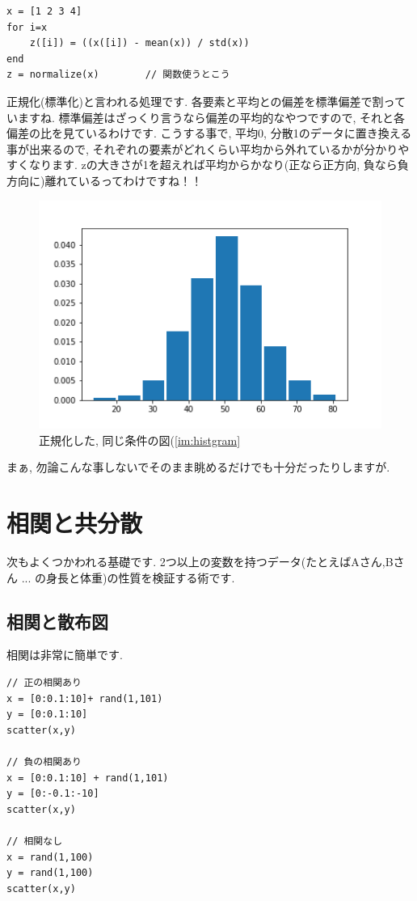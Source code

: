 \documentclass[11pt,a4paper]{jreport}
\begin{document}
\begin{lstlisting}[caption=式(\ref{eq:normalize})のコード,label=sc:normalize,  keepspaces=true]
x = [1 2 3 4]
for i=x
    z([i]) = ((x([i]) - mean(x)) / std(x))
end
z = normalize(x)        // 関数使うとこう
\end{lstlisting}



正規化(標準化)と言われる処理です. 各要素と平均との偏差を標準偏差で割っていますね. 標準偏差はざっくり言うなら偏差の平均的なやつですので, それと各偏差の比を見ているわけです. こうする事で, 平均0, 分散1のデータに置き換える事が出来るので, それぞれの要素がどれくらい平均から外れているかが分かりやすくなります. zの大きさが1を超えれば平均からかなり(正なら正方向, 負なら負方向に)離れているってわけですね！！\\

\begin{figure}[H]
\label{im:z-hist}
  \centering
  \includegraphics[width=120mm,bb=0 0 432 288]{../figures/z-hist.png}
  \caption{正規化した, 同じ条件の図(\ref{im:histgram}}
\end{figure}

まぁ, 勿論こんな事しないでそのまま眺めるだけでも十分だったりしますが.

\section{相関と共分散}
次もよくつかわれる基礎です. 2つ以上の変数を持つデータ(たとえばAさん,Bさん ... の身長と体重)の性質を検証する術です. \\
\subsection{相関と散布図}
相関は非常に簡単です. 
\begin{lstlisting}[caption=図(\ref{im:scatter1}\ref{im:scatter2})のコード,label=sc:scatter]
// 正の相関あり
x = [0:0.1:10]+ rand(1,101)
y = [0:0.1:10]
scatter(x,y)

// 負の相関あり
x = [0:0.1:10] + rand(1,101)
y = [0:-0.1:-10]
scatter(x,y)

// 相関なし
x = rand(1,100)
y = rand(1,100)
scatter(x,y)
\end{lstlisting}
\end{document}

